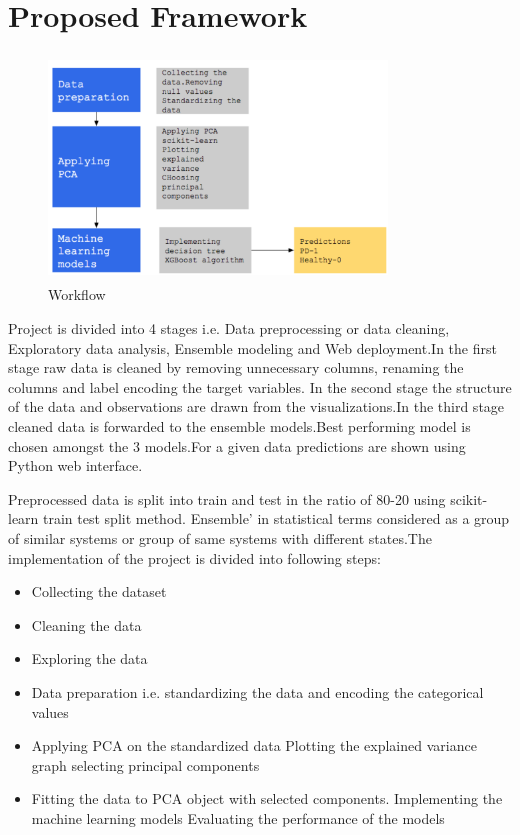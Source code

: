 \documentclass[conference]{IEEEtran}
\begin{document}
\section{Proposed Framework}
 \begin{figure}[!h]
     \centering
     \includegraphics[height=6cm,width=9cm]{WORKFLOW.png}
    \caption{Workflow}
    \label{fig:8}
 \end{figure}
Project is divided into 4 stages i.e. Data preprocessing or data cleaning, Exploratory data analysis, Ensemble modeling and Web deployment.In the first stage raw data is cleaned by removing unnecessary columns, renaming the columns and label encoding the target variables. In the second stage the structure of the data and observations are drawn from the visualizations.In the third stage cleaned data is forwarded to the ensemble models.Best performing model is chosen amongst the 3 models.For a given data predictions are shown using Python web interface.

Preprocessed data is split into train and test in the ratio of 80-20 using scikit-learn train test split method. Ensemble' in statistical terms considered as a group of similar systems or group of same systems with different states.The implementation of the project is divided into following steps:
\begin{itemize}
    \item Collecting the dataset 
    \item Cleaning the data 
    \item Exploring the data
    \item Data preparation i.e. standardizing the data and encoding the categorical values
    \item Applying PCA on the standardized data
Plotting the explained variance graph selecting principal components
\item Fitting the data to PCA object with selected components. Implementing the machine learning models
Evaluating the performance of the models
\end{itemize}
\end{document}
